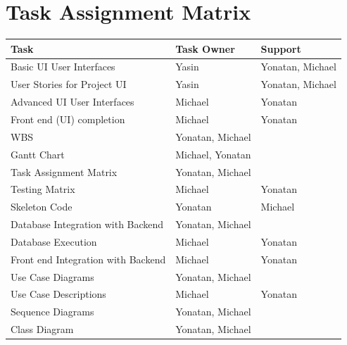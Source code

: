\documentclass[11pt]{article}
\begin{document}
    \section{Task Assignment Matrix}\label{sec:task-assignment-matrix}
    \begin{table}[H]
        \centering
        \begin{tabular}{lll}
            \toprule
            \textbf{Task}                      & \textbf{Task Owner} & \textbf{Support} \\
            \midrule
            Basic UI User Interfaces           & Yasin               & Yonatan, Michael \\
            User Stories for Project UI        & Yasin               & Yonatan, Michael \\
            Advanced UI User Interfaces        & Michael             & Yonatan          \\
            Front end (UI) completion          & Michael             & Yonatan          \\
            WBS                                & Yonatan, Michael    &                  \\
            Gantt Chart                        & Michael, Yonatan    &                  \\
            Task Assignment Matrix             & Yonatan, Michael    &                  \\
            Testing Matrix                     & Michael             & Yonatan          \\
            Skeleton Code                      & Yonatan             & Michael          \\
            Database Integration with Backend  & Yonatan, Michael    &                  \\
            Database Execution                 & Michael             & Yonatan          \\
            Front end Integration with Backend & Michael             & Yonatan          \\
            Use Case Diagrams                  & Yonatan, Michael    &                  \\
            Use Case Descriptions              & Michael             & Yonatan          \\
            Sequence Diagrams                  & Yonatan, Michael    &                  \\
            Class Diagram                      & Yonatan, Michael    &                  \\

\end{tabular}
\end{table}
\end{document}
